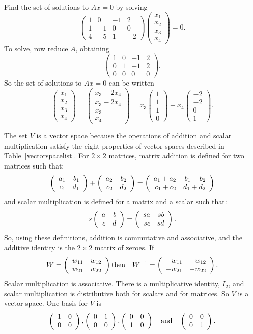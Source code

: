 \documentclass{ximera}
\begin{document}
\soln Find the set of solutions to $Ax = 0$ by solving
\[
\left(\begin{array}{rrrr} 1 & 0 & -1 & 2 \\ 1 & -1 & 0 & 0 \\ 4
& -5 & 1 & -2 \end{array}\right) \left(\begin{array}{r} x_1 \\ x_2
\\ x_3 \\ x_4 \end{array}\right) = 0.
\]
To solve, row reduce $A$, obtaining
\[
\left(\begin{array}{rrrr} 1 & 0 & -1 & 2 \\ 0 & 1 & -1 & 2 \\ 0
& 0 & 0 & 0 \end{array}\right).
\]
So the set of solutions to $Ax = 0$ can be written
\[
\left(\begin{array}{r} x_1 \\ x_2 \\ x_3 \\ x_4
\end{array}\right) = \left(\begin{array}{c} x_3 - 2x_4 \\ x_3 - 2x_4
\\ x_3 \\ x_4 \end{array}\right) = x_3\left(\begin{array}{r} 1 \\ 1
\\ 1 \\ 0 \end{array}\right) + x_4\left(\begin{array}{r} -2 \\ -2
\\ 0 \\ 1 \end{array}\right).
\]

The set $V$ is a vector space because the operations of addition and
scalar multiplication satisfy the eight properties of
vector spaces described in Table~\ref{vectorspacelist}.  For $2 \times
2$ matrices, matrix addition is defined for two matrices such that:
\[
\left(\begin{array}{rr} a_1 & b_1\\ c_1 &d_1\end{array}\right) + \left(\begin{array}{rr} a_2 & b_2\\ c_2 &d_2\end{array}\right) =
\left(\begin{array}{rr} a_1 + a_2 & b_1 + b_2\\ c_1 + c_2 &d_1 + d_2\end{array}\right)
\]
and scalar multiplication is defined for a matrix and a scalar such that:
\[
s\left(\begin{array}{rr} a & b\\ c &d\end{array}\right) = \left(\begin{array}{rr} sa & sb\\ sc &sd\end{array}\right).
\]
So, using these definitions, addition is commutative and associative,
and the additive identity is the $2 \times 2$ matrix of zeroes.  If
\[
W = \left(\begin{array}{rr} w_{11} & w_{12}\\ w_{21} &w_{22}\end{array}\right) \mbox{then}
\quad W^{-1} = \left(\begin{array}{rr} -w_{11} & -w_{12}\\ -w_{21} &-w_{22}\end{array}\right).
\]
Scalar multiplication is associative.  There is a multiplicative
identity, $I_2$, and scalar multiplication is distributive both
for scalars and for matrices.  So $V$ is a vector space.  One basis
for $V$ is
\[
\left(\begin{array}{rr} 1 & 0\\ 0 &0\end{array}\right), \left(\begin{array}{rr} 0 & 1\\ 0 &0\end{array}\right), \left(\begin{array}{rr} 0 & 0\\ 1 &0\end{array}\right)
\quad\mbox{and}\quad \left(\begin{array}{rr} 0 & 0\\ 0 &1\end{array}\right).
\]
\end{document}
